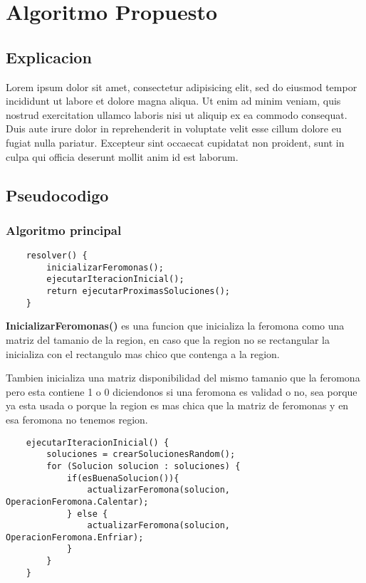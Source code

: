 \newpage
\section{Algoritmo Propuesto}\label{sec:algoritmo}
\subsection{Explicacion}

Lorem ipsum dolor sit amet, consectetur adipisicing elit, sed do eiusmod
tempor incididunt ut labore et dolore magna aliqua. Ut enim ad minim veniam,
quis nostrud exercitation ullamco laboris nisi ut aliquip ex ea commodo
consequat. Duis aute irure dolor in reprehenderit in voluptate velit esse
cillum dolore eu fugiat nulla pariatur. Excepteur sint occaecat cupidatat non
proident, sunt in culpa qui officia deserunt mollit anim id est laborum.

\subsection{Pseudocodigo}
\subsubsection{Algoritmo principal}

\begin{verbatim}
    resolver() {
        inicializarFeromonas();
        ejecutarIteracionInicial();
        return ejecutarProximasSoluciones();
    }
\end{verbatim}

\textbf{InicializarFeromonas()} es una funcion que inicializa la feromona como una matriz del tamanio de la region, en caso que la region no se rectangular la inicializa con el rectangulo mas chico que contenga a la region. 

Tambien inicializa una matriz disponibilidad del mismo tamanio que la feromona pero esta contiene 1 o 0 diciendonos si una feromona es validad o no, sea porque ya esta usada o porque la region es mas chica que la matriz de feromonas y en esa feromona no tenemos region.


\begin{verbatim}
    ejecutarIteracionInicial() {
        soluciones = crearSolucionesRandom();
        for (Solucion solucion : soluciones) {
            if(esBuenaSolucion()){
                actualizarFeromona(solucion, OperacionFeromona.Calentar);
            } else {
                actualizarFeromona(solucion, OperacionFeromona.Enfriar);
            }
        }
    }
\end{verbatim}		

